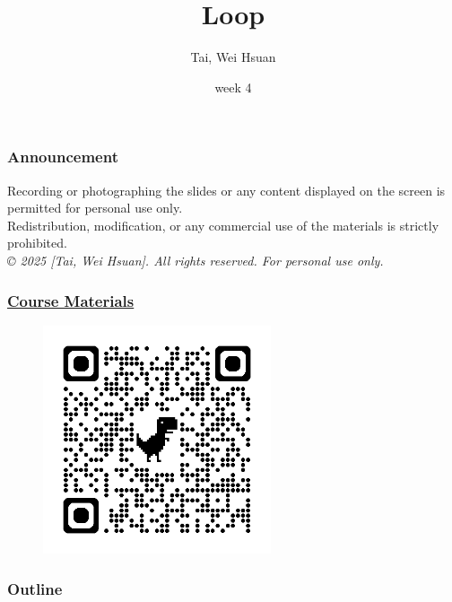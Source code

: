 \documentclass[xcolor=dvipsnames]{beamer}
\title{Loop}
\author{Tai, Wei Hsuan}
\date{week 4}
\begin{document}
	\begin{frame}
		\titlepage
	\end{frame}

\begin{frame}
    \frametitle{Announcement}
    Recording or photographing the slides or any content displayed on the screen is permitted for personal use only. \\[6pt]
    Redistribution, modification, or any commercial use of the materials is strictly prohibited. \\[12pt]
    \textit{© 2025 [Tai, Wei Hsuan]. All rights reserved. For personal use only.}
\end{frame}


    \begin{frame}
        \frametitle{\href{https://drive.google.com/drive/folders/14Tkn-rddw0k1obeOxkWi00S43M0e9wlW?usp=sharing}{Course Materials}}
        \begin{figure}
            \centering
            \includegraphics[width=0.6\textwidth]{src/qrcode.png}
        \end{figure}
    \end{frame}

    \begin{frame}
        \frametitle{Outline}
        \tableofcontents
    \end{frame}
\end{document}
